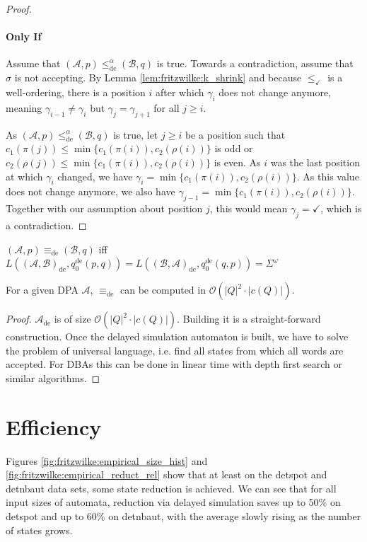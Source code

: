 \begin{proof}
	\paragraph{Only If} Assume that $(\mathcal{A}, p) \leq_\text{de}^\alpha (\mathcal{B}, q)$ is true. Towards a contradiction, assume that $\sigma$ is not accepting. By Lemma \ref{lem:fritzwilke:k_shrink} and because $\leq_\checkmark$ is a well-ordering, there is a position $i$ after which $\gamma_i$ does not change anymore, meaning $\gamma_{i-1} \neq \gamma_i$ but $\gamma_j = \gamma_{j+1}$ for all $j \geq i$.
	
	As $(\mathcal{A}, p) \leq_\text{de}^\alpha (\mathcal{B}, q)$ is true, let $j \geq i$ be a position such that $c_1(\pi(j)) \leq \min \{c_1(\pi(i)), c_2(\rho(i))\}$ is odd or $c_2(\rho(j)) \leq \min \{c_1(\pi(i)), c_2(\rho(i))\}$ is even. As $i$ was the last position at which $\gamma_i$ changed, we have $\gamma_i = \min \{c_1(\pi(i)), c_2(\rho(i))\}$. As this value does not change anymore, we also have $\gamma_{j-1} = \min \{c_1(\pi(i)), c_2(\rho(i))\}$. Together with our assumption about position $j$, this would mean $\gamma_j = \checkmark$, which is a contradiction.
\end{proof}

\begin{cor}
	$(\mathcal{A}, p) \equiv_\text{de} (\mathcal{B}, q)$ iff $L((\mathcal{A}, \mathcal{B})_\text{de}, q_0^\text{de}(p, q)) = L((\mathcal{B}, \mathcal{A})_\text{de}, q_0^\text{de}(q, p)) = \Sigma^\omega$
\end{cor}

\vspace{10pt}

\begin{theorem}
	For a given DPA $\mathcal{A}$, $\equiv_\text{de}$ can be computed in $\mathcal{O}(|Q|^2 \cdot |c(Q)|)$.
\end{theorem}

\begin{proof}
	$\mathcal{A}_\text{de}$ is of size $\mathcal{O}(|Q|^2 \cdot |c(Q)|)$. Building it is a straight-forward construction. Once the delayed simulation automaton is built, we have to solve the problem of universal language, i.e. find all states from which all words are accepted. For DBAs this can be done in linear time with depth first search or similar algorithms.
\end{proof}




\section{Efficiency}
Figures \ref{fig:fritzwilke:empirical_size_hist} and \ref{fig:fritzwilke:empirical_reduct_rel} show that at least on the \textsf{detspot} and \textsf{detnbaut} data sets, some state reduction is achieved. We can see that for all input sizes of automata, reduction via delayed simulation saves up to 50\% on \textsf{detspot} and up to 60\% on \textsf{detnbaut}, with the average slowly rising as the number of states grows.

